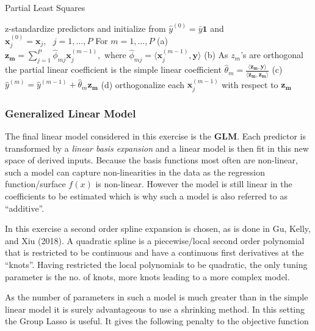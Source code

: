 \documentclass[11pt]{article}
\begin{document}
\begin{algorithm}
  \caption{Partial Least Squares}
  \begin{algorithmic}[2]
  \State z-standardize predictors and initialize from $\hat{y}^{(0)} = \bar{y}\bm{1}$ and $\bm{x}_j^{(0)} = \bm{x}_j, \textrm{  } j = 1, \dots, P$
  \State For $m = 1, \dots, P$ \newline
  (a) $\bm{z_m} = \sum_{j=1}^P \hat{\phi}_{mj} \bm{x}_j^{(m-1)}, \textrm{ where } \hat{\phi}_{mj} = \langle \bm{x}_j^{(m-1)}, \bm{y} \rangle $ \newline
  (b) As $z_m$'s are orthogonal the partial linear coefficient is the simple linear coefficient $\hat{\theta}_m = \frac{\langle \bm{z_m}, \bm{y} \rangle}{\langle \bm{z_m}, \bm{z_m} \rangle}$ \newline
  (c) $\hat{y}^{(m)} = \hat{y}^{(m-1)} + \hat{\theta}_m \bm{z_m}$ \newline
  (d) orthogonalize each $\bm{x}_j^{(m-1)}$ with respect to $\bm{z_m}$ 
  \end{algorithmic}
\end{algorithm}


\hypertarget{generalized-linear-model}{%
\subsubsection{Generalized Linear
Model}\label{generalized-linear-model}}

The final linear model considered in this exercise is the \textbf{GLM}.
Each predictor is transformed by a \emph{linear basis expansion} and a
linear model is then fit in this new space of derived inputs. Because the
basis functions most often are non-linear, such a model can capture
non-linearities in the data as the regression function/surface
\(f(x)\) is non-linear. However the model is still linear in the
coefficients to be estimated which is why such a model is also referred to
as ``additive''.

In this exercise a second order spline expansion is chosen, as is done in Gu,
Kelly, and Xiu (2018). A quadratic spline is a piecewise/local second
order polynomial that is restricted to be continuous and
have a continuous first derivatives at the ``knots''. Having restricted
the local polynomials to be quadratic, the only tuning parameter is the
no. of knots, more knots leading to a more complex model.

As the number of parameters in such a model is much greater than in the
simple linear model it is surely advantageous to use a shrinking method.
In this setting the Group Lasso is useful. It gives the following penalty to the
objective function
\end{document}
